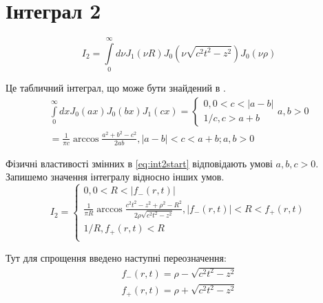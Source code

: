 \section{Інтеграл 2}
%
\begin{equation} \label{eq:int2start}
I_2 = \int \limits_{0}^{\infty} d \nu J_1 \left( \nu R \right)   
J_0 \left( \nu \sqrt{c^2t^2 - z^2} \right) J_0 \left( \nu \rho \right)
\end{equation}

Це табличний інтеграл, що може бути знайдений в \cite[ст. 228]{SpecFunc1983}.
%
\begin{equation} \begin{aligned} \label{eq:intJ0J0J1tabel}
\int \limits_{0}^{\infty} d x J_0 \left( ax \right) 
J_0 \left( bx \right) J_1 \left( cx \right) = \begin{cases}
0, 0 < c < | a - b | \\ 
1/c, c > a + b
\end{cases} a, b > 0 \\
= \frac{1}{\pi c} \arccos \frac{a^2 + b^2 - c^2}{2ab},
| a - b | < c < a + b; a,b > 0
\end{aligned} \end{equation}

Фізичні властивості змінних в \eqref{eq:int2start} відповідають умові 
$ a,b,c > 0 $. Запишемо значення інтегралу відносно інших умов.
%
\begin{equation}
I_2 = \begin{cases}
0, 0 < R < | f_{-} \left( r, t \right) | \\
\frac{1}{\pi R} \arccos \frac{c^2t^2 - z^2 + \rho^2 - R^2}
{2 \rho \sqrt{c^2t^2 - z^2}}, | f_{-} \left( r, t \right) | < R < 
f_{+} \left( r, t \right) \\ 1/R, f_{+} \left( r, t \right) < R \\
\end{cases}
\end{equation}

Тут для спрощення введено наступні переозначення:
%
\begin{equation*} \begin{aligned}
f_{-} \left( r, t \right) = \rho - \sqrt{c^2t^2 - z^2} \\
f_{+} \left( r, t \right) = \rho + \sqrt{c^2t^2 - z^2}
\end{aligned} \end{equation*}

